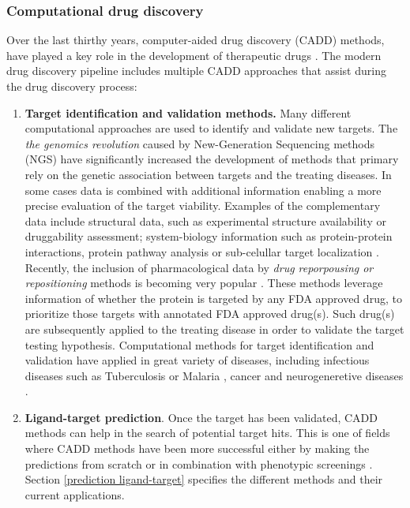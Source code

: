 \documentclass[12pt, b5paper,twoside]{tesi_upf}
\begin{document}
{\begin{figure}[htbp]
	\vspace*{4mm}
\end{figure}
  

\subsubsection{Computational drug discovery}\label{computational drug discovery}

\par Over the last thirthy years, computer-aided drug discovery (CADD) methods, have played a key role in the development of therapeutic drugs \cite{Sliwoski2014}. The modern drug discovery pipeline includes multiple CADD approaches that assist during the drug discovery process:

\begin{enumerate}

\item \textbf{Target identification and validation methods.} Many different computational approaches are used to identify and validate new targets. The \textit{the genomics revolution} caused by New-Generation Sequencing methods (NGS) have significantly increased the development of methods that primary rely on the genetic association between targets and the treating diseases. In some cases data is combined with additional information enabling a more precise evaluation of the target viability. Examples of the complementary data include structural data,  
such as experimental structure availability or druggability assessment; system-biology information such as protein-protein interactions, protein pathway analysis or sub-celullar target localization \cite{Yang2009}. Recently, the inclusion of pharmacological data by \textit{drug reporpousing or repositioning} methods is becoming very popular \cite{predict, Zhang2011, YutakaFukuoka2013}. These methods leverage information of whether the protein is targeted by any FDA approved drug, to prioritize those targets with annotated FDA approved drug(s). Such drug(s) are subsequently applied to the treating disease in order to validate the target testing hypothesis. Computational methods for target identification and validation have applied in great variety of diseases, including infectious diseases such as Tuberculosis \cite{Raman2008} or Malaria \cite{Phaiphinit2016}, cancer \cite{Jeon2014} and neurogeneretive diseases \cite{Augustin2012}. 

\item \textbf{Ligand-target prediction}. Once the target has been validated, CADD methods can help in the search of potential target hits. This is one of fields where CADD methods have been more successful either by making the predictions from scratch or in combination with phenotypic screenings \cite{Martinez-Jimenez2013}. Section \ref{prediction ligand-target} specifies the different methods and their current applications.   


\end{enumerate}}
\end{document}
